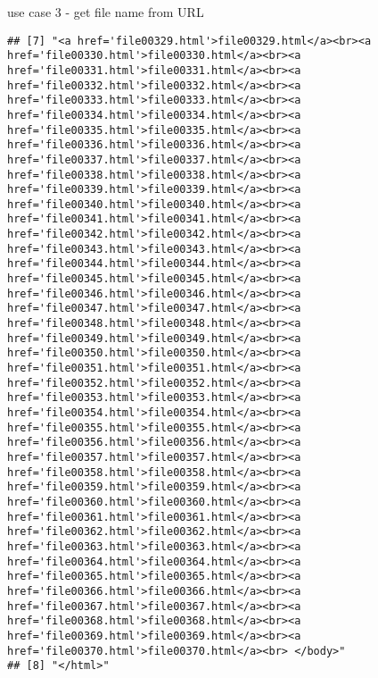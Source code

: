 \documentclass[ignorenonframetext,]{beamer}
\begin{document}
\begin{frame}[fragile]{use case 3 - get file name from URL}
\begin{verbatim}
## [7] "<a href='file00329.html'>file00329.html</a><br><a href='file00330.html'>file00330.html</a><br><a href='file00331.html'>file00331.html</a><br><a href='file00332.html'>file00332.html</a><br><a href='file00333.html'>file00333.html</a><br><a href='file00334.html'>file00334.html</a><br><a href='file00335.html'>file00335.html</a><br><a href='file00336.html'>file00336.html</a><br><a href='file00337.html'>file00337.html</a><br><a href='file00338.html'>file00338.html</a><br><a href='file00339.html'>file00339.html</a><br><a href='file00340.html'>file00340.html</a><br><a href='file00341.html'>file00341.html</a><br><a href='file00342.html'>file00342.html</a><br><a href='file00343.html'>file00343.html</a><br><a href='file00344.html'>file00344.html</a><br><a href='file00345.html'>file00345.html</a><br><a href='file00346.html'>file00346.html</a><br><a href='file00347.html'>file00347.html</a><br><a href='file00348.html'>file00348.html</a><br><a href='file00349.html'>file00349.html</a><br><a href='file00350.html'>file00350.html</a><br><a href='file00351.html'>file00351.html</a><br><a href='file00352.html'>file00352.html</a><br><a href='file00353.html'>file00353.html</a><br><a href='file00354.html'>file00354.html</a><br><a href='file00355.html'>file00355.html</a><br><a href='file00356.html'>file00356.html</a><br><a href='file00357.html'>file00357.html</a><br><a href='file00358.html'>file00358.html</a><br><a href='file00359.html'>file00359.html</a><br><a href='file00360.html'>file00360.html</a><br><a href='file00361.html'>file00361.html</a><br><a href='file00362.html'>file00362.html</a><br><a href='file00363.html'>file00363.html</a><br><a href='file00364.html'>file00364.html</a><br><a href='file00365.html'>file00365.html</a><br><a href='file00366.html'>file00366.html</a><br><a href='file00367.html'>file00367.html</a><br><a href='file00368.html'>file00368.html</a><br><a href='file00369.html'>file00369.html</a><br><a href='file00370.html'>file00370.html</a><br> </body>"
## [8] "</html>"
\end{verbatim}

\end{frame}
\end{document}
